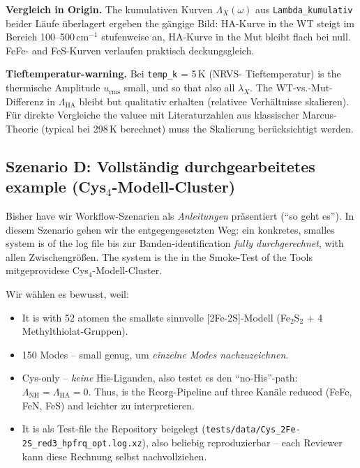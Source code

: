\documentclass[11pt,a4paper,twoside]{article}
\theoremstyle{remark}
\begin{document}
\textbf{Vergleich in Origin.} The kumulativen Kurven
$\Lambda_X(\omega)$ aus \texttt{Lambda\_kumulativ} beider L\"aufe
\"uberlagert ergeben the g\"angige Bild: HA-Kurve in the WT steigt im
Bereich 100--500\,cm$^{-1}$ stufenweise an, HA-Kurve in the Mut bleibt
flach bei null. FeFe- and FeS-Kurven verlaufen praktisch
deckungsgleich.

\begin{warnbox}
\textbf{Tieftemperatur-warning.} Bei \texttt{temp\_k} = 5\,K (NRVS-
Tieftemperatur) is the thermische Amplitude $u_\text{rms}$ small,
und so that also all $\lambda_X$. The WT-vs.-Mut-Differenz in
$\Lambda_\text{HA}$ bleibt but qualitativ erhalten (relativee
Verh\"altnisse skalieren). F\"ur direkte Vergleiche the valuee mit
Literaturzahlen aus klassischer Marcus-Theorie (typical bei 298\,K
berechnet) muss the Skalierung ber\"ucksichtigt werden.
\end{warnbox}

\subsection{Szenario D: Vollst\"andig durchgearbeitetes example
            (Cys$_4$-Modell-Cluster)}
\label{sec:workflow-worked-example}

Bisher have wir Workflow-Szenarien als \emph{Anleitungen} pr\"asentiert
("`so geht es"'). In diesem Szenario gehen wir the entgegengesetzten Weg:
ein konkretes, smalles system is of the log file bis zur
Banden-identification \emph{fully durchgerechnet}, with allen
Zwischengr\"o{\ss}en. The system is the in the Smoke-Test of the Tools
mitgeprovidese Cys$_4$-Modell-Cluster.

Wir w\"ahlen es bewusst, weil:
\begin{itemize}\setlength{\itemsep}{0pt}
  \item It is with 52 atomen the smallste sinnvolle [2Fe-2S]-Modell
        (Fe$_2$S$_2$ + 4 Methylthiolat-Gruppen).
  \item 150 Modes -- small genug, um \emph{einzelne Modes
        nachzuzeichnen}.
  \item Cys-only -- \emph{keine} His-Liganden, also testet es den
        "`no-His"'-path: $\Lambda_\text{NH} = \Lambda_\text{HA} = 0$.
        Thus, is the Reorg-Pipeline auf three Kan\"ale reduced
        (FeFe, FeN, FeS) and leichter zu interpretieren.
  \item It is als Test-file the Repository beigelegt
        (\texttt{tests/data/Cys\_2Fe-2S\_red3\_hpfrq\_opt.log.xz}),
        also beliebig reproduzierbar -- each Reviewer kann diese
        Rechnung selbst nachvollziehen.
\end{itemize}
\end{document}
